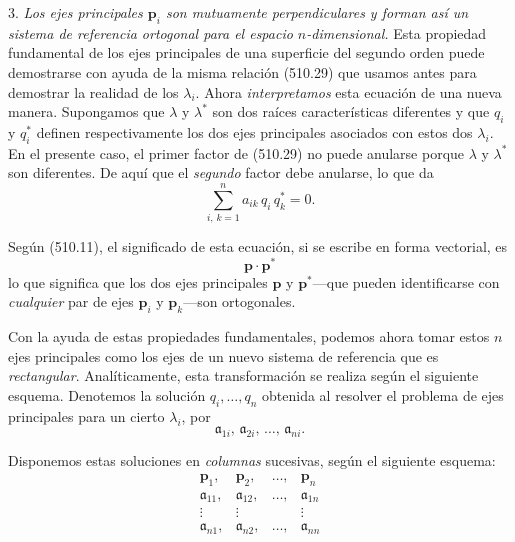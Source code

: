 \documentclass[12pt,a4paper]{book}
\newcommand{\vect}[1]{\mathbf{#1}}
\begin{document}
3. \textit{Los ejes principales $\vect{p}_i$ son mutuamente perpendiculares y forman así un sistema de referencia ortogonal para el espacio $n$-dimensional.} Esta propiedad fundamental de los ejes principales de una superficie del segundo orden puede demostrarse con ayuda de la misma relación (510.29) que usamos antes para demostrar la realidad de los $\lambda_i$. Ahora \textit{interpretamos} esta ecuación de una nueva manera. Supongamos que $\lambda$ y $\lambda^*$ son dos raíces características diferentes y que $q_i$ y $q_i^*$ definen respectivamente los dos ejes principales asociados con estos dos $\lambda_i$. En el presente caso, el primer factor de (510.29) no puede anularse porque $\lambda$ y $\lambda^*$ son diferentes. De aquí que el \textit{segundo} factor debe anularse, lo que da
\begin{equation}
\sum_{i,\,k=1}^{n} a_{ik}\,q_i\,q_k^* = 0. \tag{510.32}
\end{equation}

Según (510.11), el significado de esta ecuación, si se escribe en forma vectorial, es
\begin{equation}
\vect{p} \cdot \vect{p}^* \tag{510.33}
\end{equation}
lo que significa que los dos ejes principales $\vect{p}$ y $\vect{p}^*$---que pueden identificarse con \textit{cualquier} par de ejes $\vect{p}_i$ y $\vect{p}_k$---son ortogonales.


Con la ayuda de estas propiedades fundamentales, podemos ahora tomar estos $n$ ejes principales como los ejes de un nuevo sistema de referencia que es \textit{rectangular}. Analíticamente, esta transformación se realiza según el siguiente esquema. Denotemos la solución $q_i, \ldots, q_n$ obtenida al resolver el problema de ejes principales para un cierto $\lambda_i$, por
\begin{equation}
\mathfrak{a}_{1i}, \, \mathfrak{a}_{2i}, \, \ldots, \, \mathfrak{a}_{ni}. \tag{510.34}
\end{equation}

Disponemos estas soluciones en \textit{columnas} sucesivas, según el siguiente esquema:
\[
\begin{array}{cccc}
\vect{p}_1, & \vect{p}_2, & \ldots, & \vect{p}_n \\
\hline
\mathfrak{a}_{11}, & \mathfrak{a}_{12}, & \ldots, & \mathfrak{a}_{1n} \\
\vdots & \vdots & & \vdots \\
\mathfrak{a}_{n1}, & \mathfrak{a}_{n2}, & \ldots, & \mathfrak{a}_{nn}
\end{array}
\]
\end{document}
